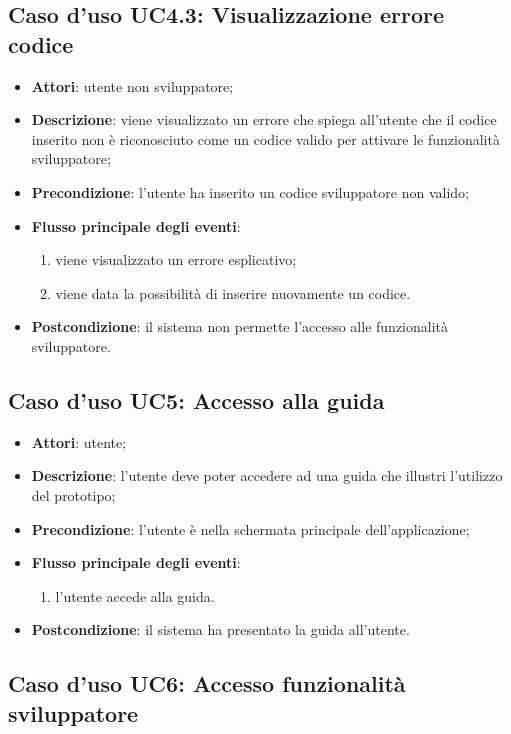 \documentclass[../AnalisiDeiRequisiti.tex]{subfiles}
\begin{document}
\subsection{Caso d'uso UC4.3: Visualizzazione errore codice}
\begin{itemize}
	\item \textbf{Attori}: utente non sviluppatore;
	\item \textbf{Descrizione}: viene visualizzato un errore che spiega all'utente che il codice inserito non è riconosciuto come un codice valido per attivare le funzionalità sviluppatore; 
	\item \textbf{Precondizione}: l'utente ha inserito un codice sviluppatore non valido;
	
	\item \textbf{Flusso principale degli eventi}:
	\begin{enumerate}
		\item viene visualizzato un errore esplicativo;
		\item viene data la possibilità di inserire nuovamente un codice.
		
	\end{enumerate}
	\item \textbf{Postcondizione}: il sistema non permette l'accesso alle funzionalità sviluppatore.
\end{itemize}
\hypertarget{UC5}{}
\subsection{Caso d'uso UC5: Accesso alla guida}
\begin{itemize}
	\item \textbf{Attori}: utente;
	\item \textbf{Descrizione}: l'utente deve poter accedere ad una guida che illustri l'utilizzo del prototipo; 
	\item \textbf{Precondizione}: l'utente è nella schermata principale dell'applicazione;
	
	\item \textbf{Flusso principale degli eventi}:
	\begin{enumerate}
		\item l'utente accede alla guida.
		
	\end{enumerate}
	\item \textbf{Postcondizione}: il sistema ha presentato la guida all'utente.
\end{itemize}
\hypertarget{UC6}{}
\subsection{Caso d'uso UC6: Accesso funzionalità sviluppatore}
\end{document}
